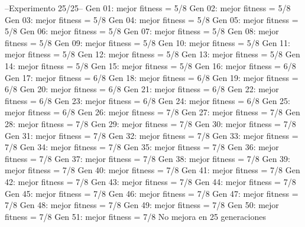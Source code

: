 --Experimento 
 25/25--
Gen 01: mejor fitness = 5/8
Gen 02: mejor fitness = 5/8
Gen 03: mejor fitness = 5/8
Gen 04: mejor fitness = 5/8
Gen 05: mejor fitness = 5/8
Gen 06: mejor fitness = 5/8
Gen 07: mejor fitness = 5/8
Gen 08: mejor fitness = 5/8
Gen 09: mejor fitness = 5/8
Gen 10: mejor fitness = 5/8
Gen 11: mejor fitness = 5/8
Gen 12: mejor fitness = 5/8
Gen 13: mejor fitness = 5/8
Gen 14: mejor fitness = 5/8
Gen 15: mejor fitness = 5/8
Gen 16: mejor fitness = 6/8
Gen 17: mejor fitness = 6/8
Gen 18: mejor fitness = 6/8
Gen 19: mejor fitness = 6/8
Gen 20: mejor fitness = 6/8
Gen 21: mejor fitness = 6/8
Gen 22: mejor fitness = 6/8
Gen 23: mejor fitness = 6/8
Gen 24: mejor fitness = 6/8
Gen 25: mejor fitness = 6/8
Gen 26: mejor fitness = 7/8
Gen 27: mejor fitness = 7/8
Gen 28: mejor fitness = 7/8
Gen 29: mejor fitness = 7/8
Gen 30: mejor fitness = 7/8
Gen 31: mejor fitness = 7/8
Gen 32: mejor fitness = 7/8
Gen 33: mejor fitness = 7/8
Gen 34: mejor fitness = 7/8
Gen 35: mejor fitness = 7/8
Gen 36: mejor fitness = 7/8
Gen 37: mejor fitness = 7/8
Gen 38: mejor fitness = 7/8
Gen 39: mejor fitness = 7/8
Gen 40: mejor fitness = 7/8
Gen 41: mejor fitness = 7/8
Gen 42: mejor fitness = 7/8
Gen 43: mejor fitness = 7/8
Gen 44: mejor fitness = 7/8
Gen 45: mejor fitness = 7/8
Gen 46: mejor fitness = 7/8
Gen 47: mejor fitness = 7/8
Gen 48: mejor fitness = 7/8
Gen 49: mejor fitness = 7/8
Gen 50: mejor fitness = 7/8
Gen 51: mejor fitness = 7/8
No mejora en 25 generaciones
